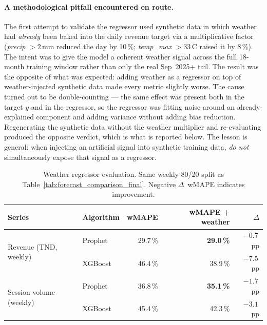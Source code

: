 \paragraph{A methodological pitfall encountered en route.}
The first attempt to validate the regressor used synthetic data in which
weather had \emph{already} been baked into the daily revenue target via a
multiplicative factor (\textit{precip} $> 2$\,mm reduced the day by
10\,\%; \textit{temp\_max} $> 33$\,\degree C raised it by 8\,\%). The
intent was to give the model a coherent weather signal across the full
18-month training window rather than only the real Sep~2025+ tail.
The result was the opposite of what was expected: adding weather as a
regressor on top of weather-injected synthetic data made every metric
slightly worse. The cause turned out to be double-counting --- the same
effect was present both in the target $y$ and in the regressor, so the
regressor was fitting noise around an already-explained component and
adding variance without adding bias reduction. Regenerating the synthetic
data without the weather multiplier and re-evaluating produced the
opposite verdict, which is what is reported below. The lesson is general:
when injecting an artificial signal into synthetic training data,
\emph{do not} simultaneously expose that signal as a regressor.

\begin{table}[H]
  \centering
  \caption{Weather regressor evaluation. Same weekly 80/20 split as
           Table~\ref{tab:forecast_comparison_final}. Negative
           $\Delta$~wMAPE indicates improvement.\label{tab:weather_regressor}}
  \begin{tabular}{llrrr}
    \toprule
    \textbf{Series} & \textbf{Algorithm} & \textbf{wMAPE} &
    \textbf{wMAPE + weather} & \textbf{$\Delta$} \\
    \midrule
    \multirow{2}{*}{Revenue (TND, weekly)}
      & Prophet & 29.7\,\% & \textbf{29.0\,\%} & $-0.7$\,pp \\
      & XGBoost & 46.4\,\% & 38.9\,\% & $-7.5$\,pp \\
    \midrule
    \multirow{2}{*}{Session volume (weekly)}
      & Prophet & 36.8\,\% & \textbf{35.1\,\%} & $-1.7$\,pp \\
      & XGBoost & 45.4\,\% & 42.3\,\% & $-3.1$\,pp \\
    \bottomrule
  \end{tabular}
\end{table}

